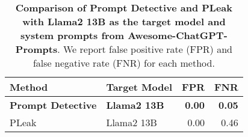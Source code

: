 \begin{table}[t!] \caption{{\bf Comparison of Prompt Detective and PLeak with Llama2 13B as the target model and system prompts from Awesome-ChatGPT-Prompts}. We report false positive rate (FPR) and false negative rate (FNR) for each method.}
\label{tab: prompt-reconstruction-baselines} \centering \setlength{\tabcolsep}{5pt} 
\begin{tabular}{llrr} 
\toprule Method & Target Model & FPR & FNR \\
\midrule \textbf{Prompt Detective} & \textbf{Llama2 13B} & \textbf{0.00} & \textbf{0.05} \\ PLeak & Llama2 13B & 0.00 & 0.46 \\ 
\bottomrule 
\end{tabular} 
\end{table}